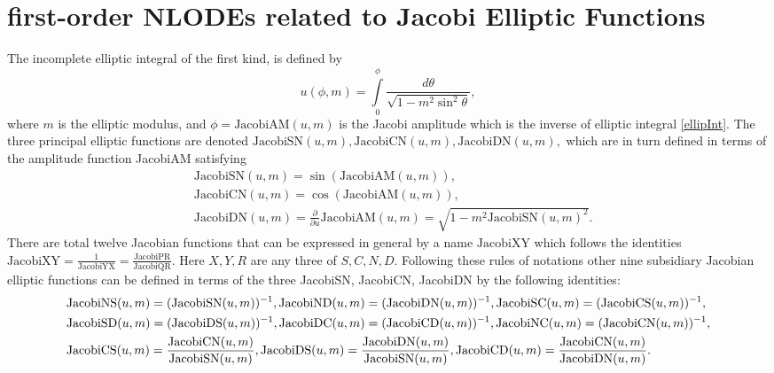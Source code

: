 \documentclass[prd,aps,floats,showkeys,nofootinbib,notitlepage]{revtex4}
\begin{document}
	\renewcommand{\theequation}{C-\arabic{equation}}
	\section{first-order NLODEs related to Jacobi Elliptic Functions}\label{sec:appenC}
	The incomplete elliptic integral of the first kind, is defined by
	\begin{equation}\label{ellipInt}
		u(\phi,m) = \int\limits_0^\phi  {\frac{{d\theta }}{{\sqrt {1 - {m^2}{{\sin }^2}\theta } }}},
	\end{equation}
	where $m$ is the elliptic modulus, and $\phi=\text{JacobiAM}(u,m)$ is the Jacobi amplitude which is the inverse of  elliptic integral \eqref{ellipInt}. The three principal elliptic functions are denoted $\text{JacobiSN}(u,m),\text{JacobiCN}(u,m),\text{JacobiDN}(u,m),$ which are in turn defined in terms of the amplitude function JacobiAM satisfying
	\begin{align}
		&\text{JacobiSN}(u,m)=\sin\left(\text{JacobiAM}(u,m)\right),\\
		&\text{JacobiCN}(u,m)=\cos\left(\text{JacobiAM}(u,m)\right),\\
		&\text{JacobiDN}(u,m)=\frac{\partial}{\partial u}\text{JacobiAM}(u,m)=\sqrt{1-m^2\text{JacobiSN}(u,m)^2}.
	\end{align}
	There are total twelve Jacobian functions that can be expressed in general by a name $\text{JacobiXY}$ which follows the identities $\text{JacobiXY}=\frac{1}{\text{JacobiYX}}=\frac{\text{JacobiPR}}{\text{JacobiQR}}$. Here $X,Y,R$ are any three of $S,C,N,D$. Following these rules of notations other nine subsidiary Jacobian elliptic functions can be defined in terms of the three JacobiSN, JacobiCN, JacobiDN by the following identities:
	\begin{align}
		&  {\text{JacobiNS}}(u,m) = {({\text{JacobiSN}}(u,m))^{ - 1}},{\text{JacobiND}}(u,m) = {({\text{JacobiDN}}(u,m))^{ - 1}},{\text{JacobiSC}}(u,m) = {({\text{JacobiCS}}(u,m))^{ - 1}}, \hfill\nonumber \\
		& {\text{JacobiSD}}(u,m) = {({\text{JacobiDS}}(u,m))^{ - 1}},{\text{JacobiDC}}(u,m) = {({\text{JacobiCD}}(u,m))^{ - 1}}, {\text{JacobiNC}}(u,m) = {({\text{JacobiCN}}(u,m))^{ - 1}},\nonumber\\
		&{\text{JacobiCS}}(u,m) = \frac{{{\text{JacobiCN}}(u,m)}}{{{\text{JacobiSN}}(u,m)}},{\text{JacobiDS}}(u,m) = \frac{{{\text{JacobiDN}}(u,m)}}{{{\text{JacobiSN}}(u,m)}},{\text{JacobiCD}}(u,m) = \frac{{{\text{JacobiCN}}(u,m)}}{{{\text{JacobiDN}}(u,m)}}.
	\end{align}
\end{document}
